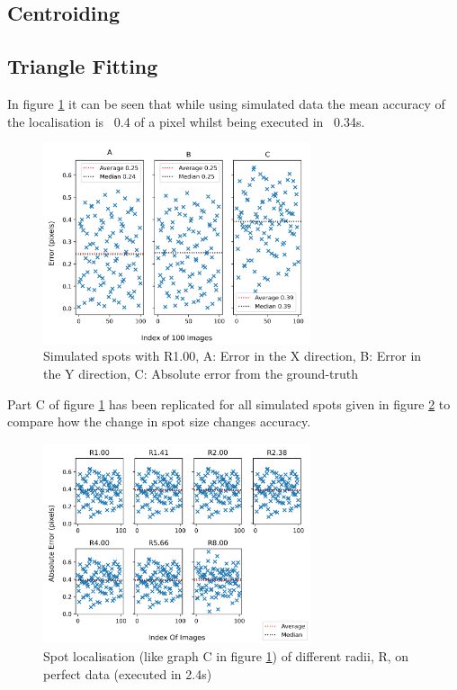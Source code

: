\documentclass[aps,pra,a4paper,nofootinbib,onecolumn,tightenlines,longbibliography,12pt,amsfonts,amssymb,amsmath,floatfix]{revtex4-2} %
\begin{document}
  \subsection{Centroiding} %
  \label{sub:Centroiding_results}
  
  \subsection{Triangle Fitting} %
  \label{sub:Triangle Fitting}

  In figure \ref{fig:single_test} it can be seen that while using simulated data the mean accuracy of the 
  localisation is ~0.4 of a pixel whilst being executed in ~0.34s.

  \begin{figure}[H]
      \begin{center}
        \includegraphics[width=0.7\textwidth]{project_pics/single_test.png}
      \end{center}
      \caption{Simulated spots with R1.00, A: Error in the X direction, B: Error in the Y direction, C: Absolute error from the ground-truth}
      \label{fig:single_test}
    \end{figure}


    Part C of figure \ref{fig:single_test} has been replicated for all simulated spots given in figure \ref{fig:no_noise_all_r}
    to compare how the change in spot size changes accuracy.

  \begin{figure}[H]
    \begin{center}
      \includegraphics[width=0.7\textwidth]{project_pics/no_noise_all_r.png}
    \end{center}
    \caption{Spot localisation (like graph C in figure \ref{fig:single_test}) of different radii, R, on perfect data (executed in 2.4s)}
    \label{fig:no_noise_all_r}
  \end{figure}
  
\end{document}
